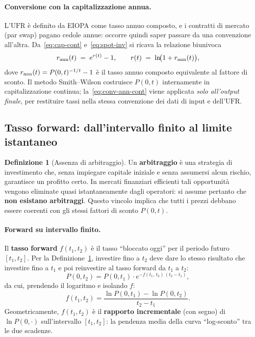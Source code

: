 \documentclass[11pt,a4paper]{article}
\theoremstyle{plain}
\theoremstyle{definition}
\newtheorem{definizione}[teorema]{Definizione}
\theoremstyle{remark}
\newcommand{\UFR}{\ensuremath{\mathrm{UFR}}}
\begin{document}
\paragraph{Conversione con la capitalizzazione annua.}
L'$\UFR$ \`e definito da EIOPA come tasso annuo composto, e i contratti di mercato (par
swap) pagano cedole annue: occorre quindi saper passare da una convenzione all'altra.
Da~\eqref{eq:cap-cont} e~\eqref{eq:spot-inv} si ricava la relazione biunivoca
\begin{equation}
  r_{\rm ann}(t) \;=\; e^{r(t)} - 1,
  \qquad
  r(t) \;=\; \ln\!\bigl(1 + r_{\rm ann}(t)\bigr),
  \label{eq:conv-ann-cont}
\end{equation}
dove $r_{\rm ann}(t) = P(0,t)^{-1/t}-1$ \`e il tasso annuo composto equivalente al fattore
di sconto. Il metodo Smith--Wilson costruisce $P(0,t)$ internamente in capitalizzazione
continua; la~\eqref{eq:conv-ann-cont} viene applicata \emph{solo all'output finale}, per
restituire tassi nella stessa convenzione dei dati di input e dell'$\UFR$.

\subsection{Tasso forward: dall'intervallo finito al limite istantaneo}


\begin{definizione}[Assenza di arbitraggio]
\label{def:noarb}
Un \textbf{arbitraggio} \`e una strategia di investimento che, senza impiegare capitale
iniziale e senza assumersi alcun rischio, garantisce un profitto certo. In mercati
finanziari efficienti tali opportunit\`a vengono eliminate quasi istantaneamente dagli
operatori: si assume pertanto che \textbf{non esistano arbitraggi}. Questo vincolo implica
che tutti i prezzi debbano essere coerenti con gli stessi fattori di sconto $P(0,t)$.
\end{definizione}

\paragraph{Forward su intervallo finito.}
Il \textbf{tasso forward} $f(t_1, t_2)$ \`e il tasso ``bloccato oggi'' per il periodo
futuro $[t_1, t_2]$. Per la Definizione~\ref{def:noarb}, investire fino a $t_2$ deve dare lo stesso
risultato che investire fino a $t_1$ e poi reinvestire al tasso forward da $t_1$ a $t_2$:
\[
  P(0, t_2) = P(0, t_1) \cdot e^{-f(t_1,\,t_2)\,(t_2-t_1)},
\]
da cui, prendendo il logaritmo e isolando $f$:
\begin{equation}
  f(t_1, t_2) = \frac{\ln P(0,t_1) - \ln P(0,t_2)}{t_2 - t_1}.
  \label{eq:fwd-finito}
\end{equation}
Geometricamente, $f(t_1,t_2)$ \`e il \textbf{rapporto incrementale} (con segno) di
$\ln P(0,\cdot)$ sull'intervallo $[t_1,t_2]$: la pendenza media della curva
``log-sconto'' tra le due scadenze.
\end{document}
